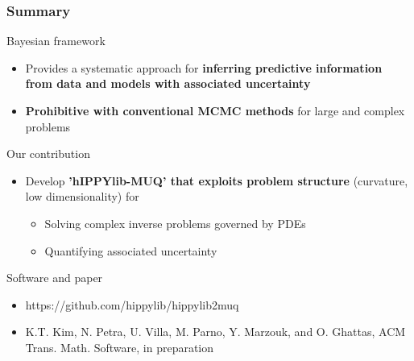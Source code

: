 \documentclass{beamer}
\begin{document}
\begin{frame}[c]
  \frametitle{Summary}

  \begin{alertblock}{Bayesian framework}
    \begin{itemize}
      \item Provides a systematic approach for {\bf inferring predictive
          information from data and models with associated uncertainty}
      \item {\bf Prohibitive with conventional MCMC methods} for large and complex
        problems
    \end{itemize}
  \end{alertblock}

  \begin{alertblock}{Our contribution}
    \begin{itemize}
      \item Develop {\bf 'hIPPYlib-MUQ' that exploits problem structure} (curvature,
        low dimensionality) for
        \begin{itemize}
          \item Solving complex inverse problems governed by PDEs
          \item Quantifying associated uncertainty
        \end{itemize}
    \end{itemize}
  \end{alertblock}

  \begin{alertblock}{Software and paper}
    \begin{itemize}
      \item https://github.com/hippylib/hippylib2muq
      \item \scriptsize{K.T. Kim, N. Petra, U.  Villa, M. Parno, Y. Marzouk, and O. Ghattas,
        ACM Trans. Math. Software, in preparation}
    \end{itemize}
  \end{alertblock}

\end{frame}
\end{document}
